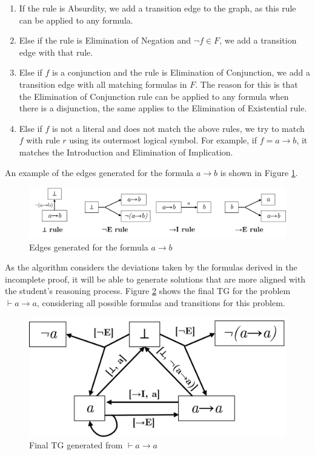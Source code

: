 \documentclass[runningheads]{llncs}
\begin{document}
\begin{enumerate}
\begin{enumerate}
            \begin{enumerate}
                \item If the rule is Absurdity, we add a transition edge to the graph, as this rule can be applied to any formula.
                \item Else if the rule is Elimination of Negation and \(\lnot f \in F\), we add a transition edge with that rule.
                \item Else if \(f\) is a conjunction and the rule is Elimination of Conjunction, we add a transition edge with all matching formulas in \(F\). The reason for this is that the Elimination of Conjunction rule can be applied to any formula when there is a disjunction, the same applies to the Elimination of Existential rule.
                \item Else if \(f\) is not a literal and does not match the above rules, we try to match \(f\) with rule \(r\) using its outermost logical symbol. For example, if \(f = a \to b\), it matches the Introduction and Elimination of Implication.
            \end{enumerate}  

            An example of the edges generated for the formula \(a \to b\) is shown in Figure \ref{fig:tg-edges}.
    
            \begin{figure}
                \centering
                \includegraphics[width=1\linewidth]{resources/tg-edges.jpg}
                \caption{Edges generated for the formula \(a \to b\)}
                \label{fig:tg-edges}
            \end{figure}
    \end{enumerate}    

    As the algorithm considers the deviations taken by the formulas derived in the incomplete proof, it will be able to generate solutions that are more aligned with the student’s reasoning process. Figure \ref{fig:tg-final} shows the final TG for the problem \(\vdash a \to a\), considering all possible formulas and transitions for this problem.

    \begin{figure}
        \centering
        \includegraphics[width=0.6\linewidth]{resources/tg-final.png}
        \caption{Final TG generated from \(\vdash a \to a\)}
        \label{fig:tg-final}
    \end{figure}
\end{enumerate}
\end{document}

